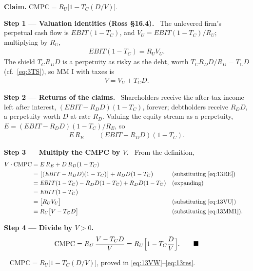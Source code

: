 \documentclass[11pt,a4paper]{article}
\numberwithin{equation}{section}
\newcommand{\step}[2]{\par\smallskip\noindent\textbf{Step #1 --- #2.}~}
\newcommand{\answer}[1]{\par\smallskip\noindent\fbox{\textbf{Answer #1.}}~}
\begin{document}
\textbf{Claim.} $\text{CMPC}=R_U\bigl[1-T_C(D/V)\bigr]$.

\step{1}{Valuation identities (Ross §16.4)} The unlevered firm's perpetual cash flow is
$\mathit{EBIT}(1-T_C)$, and $V_U=\mathit{EBIT}(1-T_C)/R_U$; multiplying by $R_U$,
\begin{align}
  \mathit{EBIT}(1-T_C) = R_U V_U. \label{eq:13VU}
\end{align}
The shield $T_C R_D D$ is a perpetuity as risky as the debt, worth $T_C R_D D/R_D=T_C D$ (cf.\
\eqref{eq:3TS}), so MM I with taxes is
\begin{align}
  V = V_U + T_C D. \label{eq:13MM1}
\end{align}

\step{2}{Returns of the claims} Shareholders receive the after-tax income left after interest,
$(\mathit{EBIT}-R_D D)(1-T_C)$, forever; debtholders receive $R_D D$, a perpetuity worth $D$ at
rate $R_D$. Valuing the equity stream as a perpetuity, $E=(\mathit{EBIT}-R_D D)(1-T_C)/R_E$, so
\begin{align}
  E\,R_E &= (\mathit{EBIT}-R_D D)(1-T_C). \label{eq:13RE}
\end{align}

\step{3}{Multiply the CMPC by $V$} From the definition,
\begin{align}
  V\cdot\text{CMPC} &= E\,R_E + D\,R_D(1-T_C) \nonumber\\
     &= \bigl[(\mathit{EBIT}-R_D D)(1-T_C)\bigr] + R_D D(1-T_C) && \text{(substituting \eqref{eq:13RE})} \nonumber\\
     &= \mathit{EBIT}(1-T_C)-R_DD(1-T_C)+R_DD(1-T_C) && \text{(expanding)} \nonumber\\
     &= \mathit{EBIT}(1-T_C) \nonumber\\
     &= \bigl[R_U V_U\bigr] && \text{(substituting \eqref{eq:13VU})} \nonumber\\
     &= R_U\bigl[V - T_C D\bigr] && \text{(substituting \eqref{eq:13MM1})}. \label{eq:13VW}
\end{align}

\step{4}{Divide by $V>0$}
\begin{align}
  \text{CMPC} = R_U\,\frac{V-T_CD}{V} = R_U\Bigl[1-T_C\frac{D}{V}\Bigr]. \qquad\blacksquare \label{eq:13res}
\end{align}
\answer{(proof)} $\text{CMPC}=R_U\bigl[1-T_C(D/V)\bigr]$, proved in \eqref{eq:13VW}--\eqref{eq:13res}.
\end{document}
